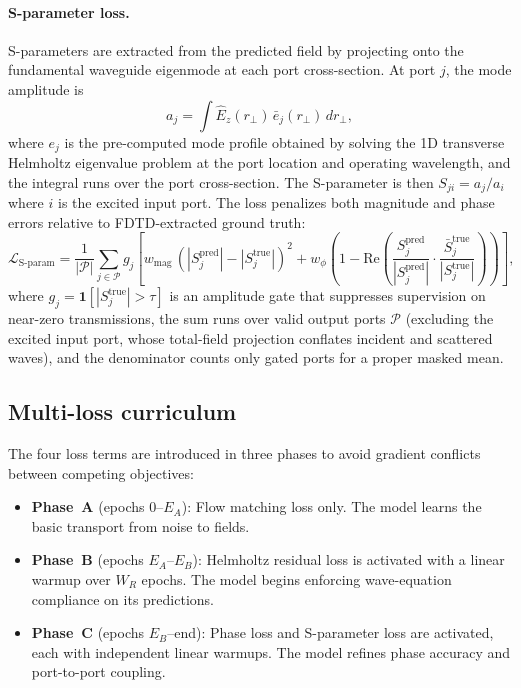 \paragraph{S-parameter loss.}
S-parameters are extracted from the predicted field by projecting onto the fundamental
waveguide eigenmode at each port cross-section. At port $j$, the mode amplitude is
\begin{equation}
    a_j = \int \hat{E}_z(r_\perp)\,\bar{e}_j(r_\perp)\,dr_\perp,
    \label{eq:overlap}
\end{equation}
where $e_j$ is the pre-computed mode profile obtained by solving the 1D transverse Helmholtz eigenvalue problem at the
port location and operating wavelength, and the integral runs over the port cross-section. The S-parameter is then
$S_{ji} = a_j / a_i$ where $i$ is the excited input port. The loss penalizes both magnitude and phase errors relative
to FDTD-extracted ground truth:
\begin{equation}
    \mathcal{L}_\text{S-param} = \frac{1}{|\mathcal{P}|}\sum_{j\in\mathcal{P}} g_j\!\left[
        w_\text{mag}\,(|S_{j}^\text{pred}| - |S_{j}^\text{true}|)^2
        + w_\phi\left(1 - \mathrm{Re}\!\left(\frac{S_j^\text{pred}}{|S_j^\text{pred}|}
          \cdot \frac{\bar{S}_j^\text{true}}{|S_j^\text{true}|}\right)\right)
    \right],
    \label{eq:sparam_loss}
\end{equation}
where $g_j = \mathbf{1}[|S_j^\text{true}| > \tau]$ is an amplitude gate that suppresses supervision on near-zero
transmissions, the sum runs over valid output ports $\mathcal{P}$ (excluding the excited input port, whose total-field
projection conflates incident and scattered waves), and the denominator counts only gated ports for a proper masked
mean.

\subsection{\label{sec:curriculum}Multi-loss curriculum}

The four loss terms are introduced in three phases to avoid gradient conflicts between competing objectives:

\begin{itemize}
    \item \textbf{Phase~A} (epochs $0$--$E_A$): Flow matching loss only. The model learns the basic transport from
          noise to fields.
    \item \textbf{Phase~B} (epochs $E_A$--$E_B$): Helmholtz residual loss is activated with a linear warmup over
          $W_R$ epochs. The model begins enforcing wave-equation compliance on its predictions.
    \item \textbf{Phase~C} (epochs $E_B$--end): Phase loss and S-parameter loss are activated, each with independent
          linear warmups. The model refines phase accuracy and port-to-port coupling.
\end{itemize}

